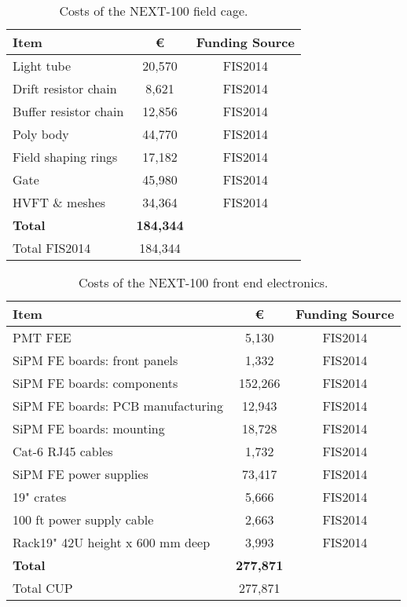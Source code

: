 \begin{table}[h!]
\begin{center}
\begin{tabular}{|l|c|c|}
\hline
Item & \euro & Funding Source \\
 \hline
 Light tube & 20,570 & FIS2014 \\
 Drift resistor chain & 8,621 & FIS2014 \\
 Buffer resistor chain & 12,856 & FIS2014\\
 Poly body & 44,770 & FIS2014 \\
 Field shaping rings & 17,182 & FIS2014 \\
 Gate &45,980 & FIS2014 \\
 HVFT \& meshes & 34,364 & FIS2014 \\
  \hline
{\bf Total} &	{\bf 184,344}	& \\
  Total FIS2014	&	184,344	& \\
 \hline\hline
\end{tabular}  
\caption{Costs of the NEXT-100 field cage.}
\label{tab.n100:FC}
\end{center}
\end{table} 

\begin{table}[h!]
\begin{center}
\begin{tabular}{|l|c|c|}
\hline
Item & \euro & Funding Source \\
 \hline
 PMT FEE & 5,130 & FIS2014 \\
 SiPM FE boards: front panels	& 1,332 & FIS2014 \\
SiPM FE boards: components	&	152,266 & FIS2014 \\
SiPM FE boards: PCB manufacturing	&	12,943  & FIS2014 \\
SiPM FE boards:  mounting	&	18,728 & FIS2014 \\
Cat-6 RJ45 cables &	1,732 & FIS2014 \\
SiPM FE power supplies & 73,417 & FIS2014 \\
19" crates  &	5,666 & FIS2014 \\
100 ft power supply cable &	2,663 & FIS2014 \\
Rack19" 42U height x 600 mm deep &	3,993 & FIS2014 \\

  \hline
{\bf Total}	&	{\bf 277,871}	& \\
 Total CUP	&	277,871	& \\
 \hline\hline
\end{tabular}  
\caption{Costs of the NEXT-100 front end electronics.}
\label{tab.n100:FEE}
\end{center}
\end{table} 

